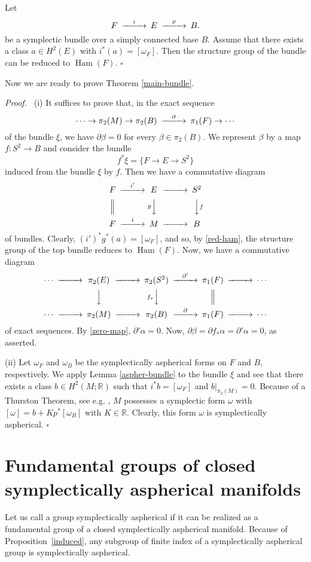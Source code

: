 \documentclass[12pt, twoside]{amsart}
\theoremstyle{plain}
\theoremstyle{definition}
\numberwithin{equation}{section}
\def\RR{\mathbb R}
\def\hqed{\hfill\hfill$\square$}
\def\ham{\operatorname {Ham}}
\def\pa{\partial}
\def\ga{\alpha}
\def\gb{\beta}
\def\RR{\mathbb R}
\def\m{\medskip}
\def\p{{\it Proof.\ }}
\begin{document}
\begin{theorem}[{\cite[Theorem 6.36]{MS}}]
\label{red-ham}
Let 
$$
\CD
F @>i>> E @>p>> B.
\endCD
$$  
be a symplectic bundle over a simply connected base $B$. Assume that there 
exists a class $a\in H^2(E)$ with $i^*(a)=[\omega_F]$. Then the structure 
group of the bundle can be reduced to $\ham(F)$.
\hqed
\end{theorem}

\m Now we are ready to prove Theorem \ref{main-bundle}.

\p
(i) It suffices to prove that, in the 
exact sequence 
$$
\CD
\cdots \to \pi_2(M) \to \pi_2(B) @>\pa >> \pi_1(F) \to \cdots
\endCD
$$
of the bundle $\xi$, we have $\pa \gb=0$ for every $\gb\in \pi_2(B)$. We 
represent $\gb$ by a map $f: S^2 \to B$ and consider the bundle 
$$
f^*\xi=\{F \to E \to S^2\}
$$
induced from the bundle $\xi$ by $f$. Then we have 
a commutative diagram 
$$
\CD
 F  @>i'>> E  @> >> S^2 \\
 @| @VgVV @VVfV \\
 F  @>i>> M  @>>> B 
\endCD
$$ 
of bundles. Clearly, $(i')^*g^*(a)=[\omega_F]$, and so, by \ref{red-ham}, the 
structure group of the top bundle reduces to $\ham(F)$. Now, we have a 
commutative diagram
$$
\CD
\cdots @>>> \pi_2(E) @>>> \pi_2(S^2) @>\pa' >> \pi_1(F) @>>> \cdots\\
@. @VVV @Vf_*VV @| @.\\
\cdots @>>> \pi_2(M) @>>> \pi_2(B) @>\pa >> \pi_1(F) @>>> \cdots
\endCD
$$ 
of exact sequences. By \ref{zero-map}, $\pa'\ga =0$. Now, 
$\pa \gb=\pa f_*\ga =\pa'\ga =0$, as asserted.

\par (ii)  Let $\omega_F$ and $\omega_B$ be the symplectically aspherical 
forms 
on $F$ and $B$, respectively. We apply Lemma 
\ref{aspher-bundle} to the bundle $\xi$ and see that there exists a class 
$b\in 
H^2(M;\RR)$ such that $i^*b=[\omega_F]$ and $b|_{\pi_2(M)} = 0$. Because of 
a Thurston Theorem, see e.g. \cite[Theorem 6.3]{MS}, $M$ possesses a 
symplectic 
form 
$\omega$ with $[\omega]=b+Kp^*[\omega_B]$ with $K\in \RR$. Clearly, this form 
$\omega$ is symplectically aspherical.  
\hqed

\part{Fundamental groups of closed symplectically aspherical manifolds}

Let us call a group symplectically aspherical if it can be realized as a 
fundamental group of a closed symplectically aspherical manifold. Because of 
Proposition~\ref{induced}, any subgroup of finite index of a symplectically 
aspherical group is symplectically aspherical.
\end{document}
